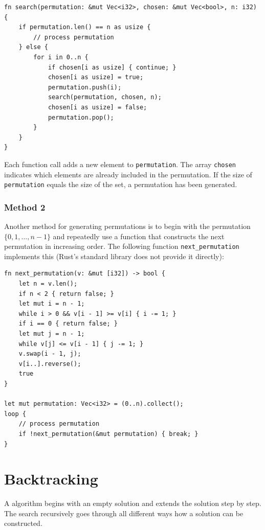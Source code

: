 \begin{lstlisting}
fn search(permutation: &mut Vec<i32>, chosen: &mut Vec<bool>, n: i32) {
    if permutation.len() == n as usize {
        // process permutation
    } else {
        for i in 0..n {
            if chosen[i as usize] { continue; }
            chosen[i as usize] = true;
            permutation.push(i);
            search(permutation, chosen, n);
            chosen[i as usize] = false;
            permutation.pop();
        }
    }
}
\end{lstlisting}

Each function call adds a new element to
\texttt{permutation}.
The array \texttt{chosen} indicates which
elements are already included in the permutation.
If the size of \texttt{permutation} equals the size of the set,
a permutation has been generated.

\subsubsection{Method 2}


Another method for generating permutations
is to begin with the permutation
$\{0,1,\ldots,n-1\}$ and repeatedly
use a function that constructs the next permutation
in increasing order.
The following function \texttt{next\_permutation}
implements this (Rust's standard library does not
provide it directly):

\begin{lstlisting}
fn next_permutation(v: &mut [i32]) -> bool {
    let n = v.len();
    if n < 2 { return false; }
    let mut i = n - 1;
    while i > 0 && v[i - 1] >= v[i] { i -= 1; }
    if i == 0 { return false; }
    let mut j = n - 1;
    while v[j] <= v[i - 1] { j -= 1; }
    v.swap(i - 1, j);
    v[i..].reverse();
    true
}

let mut permutation: Vec<i32> = (0..n).collect();
loop {
    // process permutation
    if !next_permutation(&mut permutation) { break; }
}
\end{lstlisting}

\section{Backtracking}


A  algorithm
begins with an empty solution
and extends the solution step by step.
The search recursively
goes through all different ways how
a solution can be constructed.

